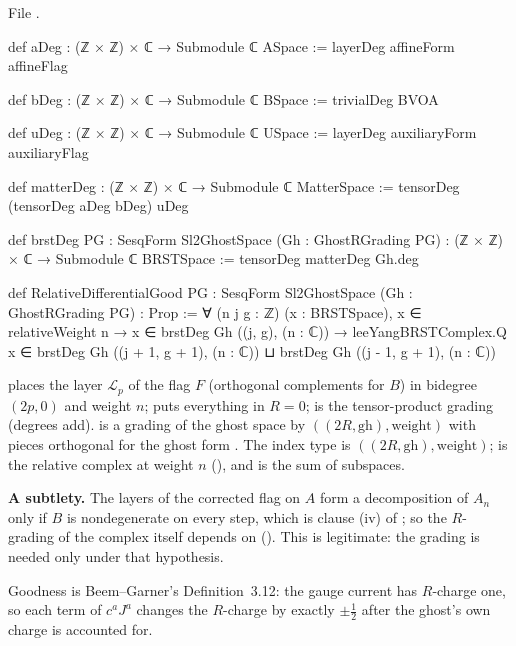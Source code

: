 \noindent File .
\begin{leancode}
def aDeg : (ℤ × ℤ) × ℂ → Submodule ℂ ASpace := layerDeg affineForm affineFlag

def bDeg : (ℤ × ℤ) × ℂ → Submodule ℂ BSpace := trivialDeg BVOA

def uDeg : (ℤ × ℤ) × ℂ → Submodule ℂ USpace := layerDeg auxiliaryForm auxiliaryFlag

def matterDeg : (ℤ × ℤ) × ℂ → Submodule ℂ MatterSpace := tensorDeg (tensorDeg aDeg bDeg) uDeg

def brstDeg {PG : SesqForm Sl2GhostSpace} (Gh : GhostRGrading PG) :
    (ℤ × ℤ) × ℂ → Submodule ℂ BRSTSpace :=
  tensorDeg matterDeg Gh.deg

def RelativeDifferentialGood {PG : SesqForm Sl2GhostSpace} (Gh : GhostRGrading PG) : Prop :=
  ∀ (n j g : ℤ) (x : BRSTSpace), x ∈ relativeWeight n → x ∈ brstDeg Gh ((j, g), (n : ℂ)) →
    leeYangBRSTComplex.Q x ∈
      brstDeg Gh ((j + 1, g + 1), (n : ℂ)) ⊔ brstDeg Gh ((j - 1, g + 1), (n : ℂ))

\end{leancode}

\begin{dictionary}
 places the layer $\mathcal L_p$ of the flag $F$ (orthogonal complements for $B$) in bidegree $(2p,0)$ and weight $n$;
 puts everything in $R=0$;  is the tensor-product grading (degrees add).  is a
grading of the ghost space by $((2R,\mathrm{gh}),\text{weight})$ with pieces orthogonal for the ghost form . The index type
 is $((2R,\mathrm{gh}),\text{weight})$;  is the relative complex at weight $n$
(), and  is the sum of subspaces.

\textbf{A subtlety.} The layers of the corrected flag on $A$ form a decomposition of $A_n$ only if $B$ is nondegenerate on every step, which is
clause (iv) of ; so the $R$-grading of the complex itself depends on  (). This is legitimate: the grading
is needed only under that hypothesis.
\end{dictionary}

\begin{physics}
Goodness is Beem--Garner's Definition~3.12: the gauge current has $R$-charge one, so each term of $c^aJ^a$ changes the $R$-charge by exactly
$\pm\tfrac12$ after the ghost's own charge is accounted for.
\end{physics}

